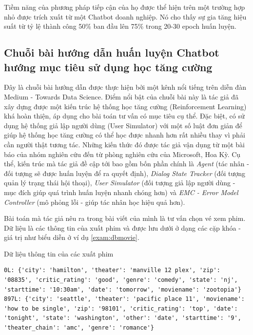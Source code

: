 Tiềm năng của phương pháp tiếp cận của họ được thể hiện trên một
trường hợp nhỏ được trích xuất từ một Chatbot doanh nghiệp. Nó
cho thấy sự gia tăng hiệu suất từ tỷ lệ thành công 50\% ban đầu
lên 75\% trong 20-30 epoch huấn luyện.

\subsection{Chuỗi bài hướng dẫn huấn luyện Chatbot hướng mục tiêu
sử dụng học tăng cường}
\label{subsec:training}
Đây là chuỗi bài hướng dẫn \cite{traininggochatbot} được thực hiện
bởi một kênh nổi tiếng trên diễn đàn Medium - Towards Data Science.
Điểm nổi bật của chuỗi bài này là tác giả đã xây dựng được một
kiến trúc hệ thống học tăng cường (Reinforcement Learning) khá
hoàn thiện, áp dụng cho bài toán tư vấn có mục tiêu cụ thể. Đặc biệt,
có sử dụng hệ thống giả lập người dùng (User Simulator) với một số
luật đơn giản để giúp hệ thống học tăng cường có thể học được nhanh
hơn rất nhiều thay vì phải cần người thật tương tác. Những kiến thức
đó được tác giả vận dụng từ một bài báo \cite{endtoend} của nhóm
nghiên cứu đến từ phòng nghiên cứu của Microsoft, Hoa Kỳ. Cụ thể,
kiến trúc mà tác giả đề cập tới bao gồm bốn phần chính là
\textit{Agent} (tác nhân - đối tượng sẽ được huấn luyện để ra
quyết định), \textit{Dialog State Tracker} (đối tượng quản lý
trạng thái hội thoại), \textit{User Simulator} (đối tượng giả lập
người dùng - mục đích giúp quá trình huấn luyện nhanh chóng hơn) và
\textit{EMC - Error Model Controller} (mô phỏng lỗi - giúp tác nhân
học hiệu quả hơn).

Bài toán mà tác giả nêu ra trong bài viết của mình là tư vấn chọn vé
xem phim. Dữ liệu là các thông tin của xuất phim và được lưu dưới ở
dạng các cặp khóa - giá trị như biểu diễn ở ví dụ \ref{exam:dbmovie}.

\renewcommand{\textboxenvname}{Ví dụ}
\begin{textbox}{Dữ liệu thông tin của các xuất phim}
\begin{Verbatim}[breaklines=true, breakanywhere=true]
0L: {'city': 'hamilton', 'theater': 'manville 12 plex', 'zip': '08835', 'critic_rating': 'good', 'genre': 'comedy', 'state': 'nj', 'starttime': '10:30am', 'date': 'tomorrow', 'moviename': 'zootopia'}
897L: {'city': 'seattle', 'theater': 'pacific place 11', 'moviename': 'how to be single', 'zip': '98101', 'critic_rating': 'top', 'date': 'tonight', 'state': 'washington', 'other': 'date', 'starttime': '9', 'theater_chain': 'amc', 'genre': 'romance'}
\end{Verbatim}
\end{textbox}

